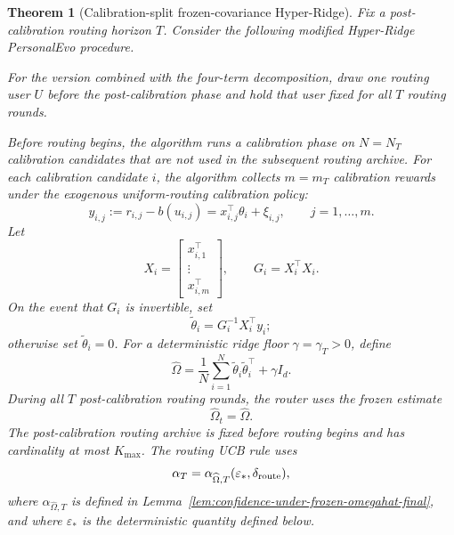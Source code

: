 \documentclass{article} %
\newtheorem{theorem}{Theorem}
\begin{document}
\begin{theorem}[Calibration-split frozen-covariance Hyper-Ridge]
\label{thm:err-control-calibration-split-final}
Fix a post-calibration routing horizon \(T\).  Consider the following modified
Hyper-Ridge PersonalEvo procedure.

For the version combined with the four-term decomposition, draw one routing
user \(U\) before the post-calibration phase and hold that user fixed for all
\(T\) routing rounds.

Before routing begins, the algorithm runs a calibration phase on
\(N=N_T\) calibration candidates that are not used in the subsequent routing
archive.  For each calibration candidate \(i\), the algorithm collects
\(m=m_T\) calibration rewards under the exogenous uniform-routing calibration
policy:
\[
y_{i,j}:=r_{i,j}-b(u_{i,j})
=x_{i,j}^{\top}\theta_i+\xi_{i,j},
\qquad j=1,\ldots,m.
\]
Let
\[
X_i=
\begin{bmatrix}
x_{i,1}^{\top}\\
\vdots\\
x_{i,m}^{\top}
\end{bmatrix},
\qquad
G_i=X_i^\top X_i.
\]
On the event that \(G_i\) is invertible, set
\[
\widetilde\theta_i=G_i^{-1}X_i^\top y_i;
\]
otherwise set \(\widetilde\theta_i=0\).  For a deterministic ridge floor
\(\gamma=\gamma_T>0\), define
\[
\widehat\Omega
=
\frac1N\sum_{i=1}^N\widetilde\theta_i\widetilde\theta_i^\top+\gamma I_d.
\]
During all \(T\) post-calibration routing rounds, the router uses the frozen
estimate
\[
\widehat\Omega_t=\widehat\Omega.
\]
The post-calibration routing archive is fixed before routing begins and has
cardinality at most \(K_{\max}\).  The routing UCB rule uses
\[
\alpha_T
=
\alpha_{\widehat\Omega,T}(\varepsilon_*,\delta_{\rm route}),
\]
where \(\alpha_{\widehat\Omega,T}\) is defined in
Lemma~\ref{lem:confidence-under-frozen-omegahat-final}, and where
\(\varepsilon_*\) is the deterministic quantity defined below.


\end{theorem}
\end{document}
